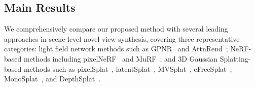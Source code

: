 \subsection{Main Results}
%
We comprehensively compare our proposed method with several leading approaches in scene-level novel view synthesis, covering three representative categories: light field network methods such as GPNR~\citep{suhail2022generalizable} and AttnRend~\citep{du2023learning}; NeRF-based methods including pixelNeRF~\citep{yu2021pixelnerf} and MuRF~\cite{xu2024murf}; and 3D Gaussian Splatting-based methods such as pixelSplat~\citep{charatan2024pixelsplat}, latentSplat~\cite{wewer2024latentsplat}, MVSplat~\citep{chen2024mvsplat}, eFreeSplat~\cite{min2024epipolar}, MonoSplat~\cite{liu2025monosplat}, and DepthSplat~\cite{xu2025depthsplat}.



